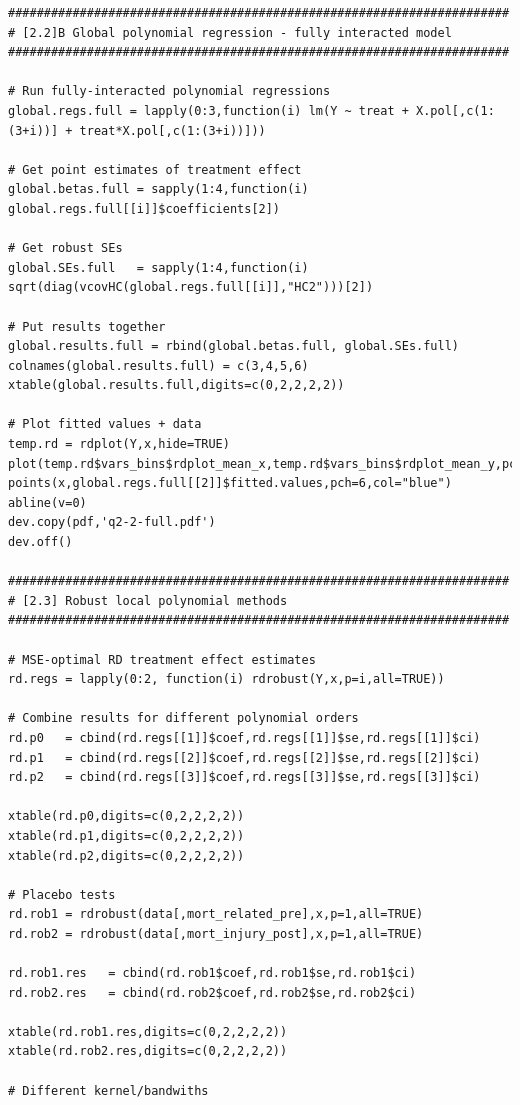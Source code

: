 \documentclass[12pt]{article}
\begin{document}
\begin{verbatim}
######################################################################
# [2.2]B Global polynomial regression - fully interacted model
######################################################################

# Run fully-interacted polynomial regressions
global.regs.full = lapply(0:3,function(i) lm(Y ~ treat + X.pol[,c(1:(3+i))] + treat*X.pol[,c(1:(3+i))]))

# Get point estimates of treatment effect
global.betas.full = sapply(1:4,function(i) global.regs.full[[i]]$coefficients[2])

# Get robust SEs
global.SEs.full   = sapply(1:4,function(i) sqrt(diag(vcovHC(global.regs.full[[i]],"HC2")))[2])

# Put results together
global.results.full = rbind(global.betas.full, global.SEs.full)
colnames(global.results.full) = c(3,4,5,6)
xtable(global.results.full,digits=c(0,2,2,2,2))

# Plot fitted values + data
temp.rd = rdplot(Y,x,hide=TRUE)
plot(temp.rd$vars_bins$rdplot_mean_x,temp.rd$vars_bins$rdplot_mean_y,pch=20,xlab="povrate60",ylab="mort_related_post")
points(x,global.regs.full[[2]]$fitted.values,pch=6,col="blue")
abline(v=0)
dev.copy(pdf,'q2-2-full.pdf')
dev.off()

######################################################################
# [2.3] Robust local polynomial methods
######################################################################

# MSE-optimal RD treatment effect estimates
rd.regs = lapply(0:2, function(i) rdrobust(Y,x,p=i,all=TRUE))

# Combine results for different polynomial orders
rd.p0   = cbind(rd.regs[[1]]$coef,rd.regs[[1]]$se,rd.regs[[1]]$ci)
rd.p1   = cbind(rd.regs[[2]]$coef,rd.regs[[2]]$se,rd.regs[[2]]$ci)
rd.p2   = cbind(rd.regs[[3]]$coef,rd.regs[[3]]$se,rd.regs[[3]]$ci)

xtable(rd.p0,digits=c(0,2,2,2,2))
xtable(rd.p1,digits=c(0,2,2,2,2))
xtable(rd.p2,digits=c(0,2,2,2,2))

# Placebo tests
rd.rob1 = rdrobust(data[,mort_related_pre],x,p=1,all=TRUE)
rd.rob2 = rdrobust(data[,mort_injury_post],x,p=1,all=TRUE)

rd.rob1.res   = cbind(rd.rob1$coef,rd.rob1$se,rd.rob1$ci)
rd.rob2.res   = cbind(rd.rob2$coef,rd.rob2$se,rd.rob2$ci)

xtable(rd.rob1.res,digits=c(0,2,2,2,2))
xtable(rd.rob2.res,digits=c(0,2,2,2,2))

# Different kernel/bandwiths


\end{verbatim}
\end{document}
